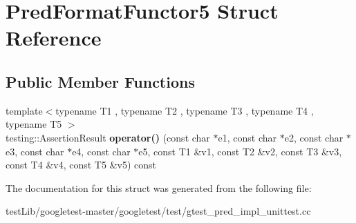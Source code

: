 \hypertarget{structPredFormatFunctor5}{}\section{Pred\+Format\+Functor5 Struct Reference}
\label{structPredFormatFunctor5}
\subsection*{Public Member Functions}
\begin{DoxyCompactItemize}
\item 
\mbox{\label{structPredFormatFunctor5_a0fe9e8e9ae614ea577cf1b34e9cfde58}} 
{\footnotesize template$<$typename T1 , typename T2 , typename T3 , typename T4 , typename T5 $>$ }\\testing\+::\+Assertion\+Result {\bfseries operator()} (const char $\ast$e1, const char $\ast$e2, const char $\ast$e3, const char $\ast$e4, const char $\ast$e5, const T1 \&v1, const T2 \&v2, const T3 \&v3, const T4 \&v4, const T5 \&v5) const
\end{DoxyCompactItemize}


The documentation for this struct was generated from the following file\+:\begin{DoxyCompactItemize}
\item 
test\+Lib/googletest-\/master/googletest/test/gtest\+\_\+pred\+\_\+impl\+\_\+unittest.\+cc\end{DoxyCompactItemize}
